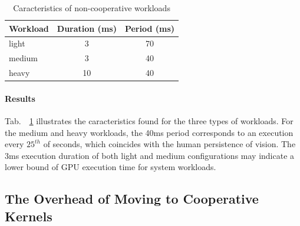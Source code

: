 \documentclass[numbers,nocopyrightspace,10pt]{sigplanconf}
\newcommand{\mytab}{Tab.~}
\begin{document}
\begin{table}
\small
\centering
\begin{tabular}{ l c c }
Workload & Duration (ms) & Period (ms)\\
\hline
light & 3 & 70\\
medium & 3 & 40\\
heavy & 10 & 40\\
\end{tabular}
\caption{Caracteristics of non-cooperative workloads}
\label{tab:noncooperativeworkload}
\end{table}

\paragraph{Results}
\mytab~\ref{tab:noncooperativeworkload} illustrates the caracteristics
found for the three types of workloads. For the medium and heavy
workloads, the 40ms period corresponds to an execution every $25^{th}$
of seconds, which coincides with the human persistence of vision. The
3ms execution duration of both light and medium configurations may
indicate a lower bound of GPU execution time for system workloads.

\subsection{The Overhead of Moving to Cooperative Kernels}

\end{document}

